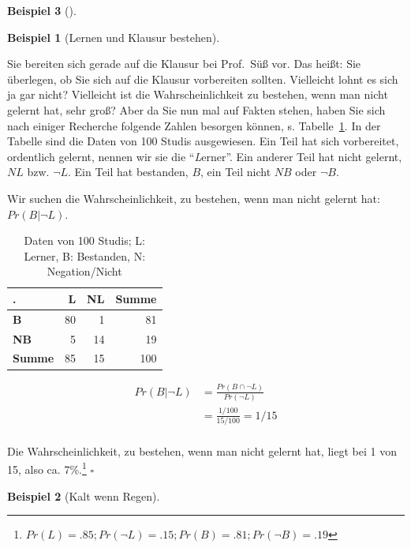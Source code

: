\documentclass[
  ngerman,
  letterpaper,
  twoside,
  open=any]{scrbook}
\theoremstyle{definition}
\newtheorem{example}{Beispiel}[chapter]
\theoremstyle{plain}
\theoremstyle{definition}
\theoremstyle{definition}
\theoremstyle{remark}
\begin{document}
\begin{example}[]
\begin{example}[Lernen und Klausur
bestehen]\protect\hypertarget{exm-klausur-bed-wskt2}{}\label{exm-klausur-bed-wskt2}

Sie bereiten sich gerade auf die Klausur bei Prof.~Süß vor. Das heißt:
Sie überlegen, ob Sie sich auf die Klausur vorbereiten sollten.
Vielleicht lohnt es sich ja gar nicht? Vielleicht ist die
Wahrscheinlichkeit zu bestehen, wenn man nicht gelernt hat, sehr groß?
Aber da Sie nun mal auf Fakten stehen, haben Sie sich nach einiger
Recherche folgende Zahlen besorgen können, s.
Tabelle~\ref{tbl-klausur-lernen}. In der Tabelle sind die Daten von 100
Studis ausgewiesen. Ein Teil hat sich vorbereitet, ordentlich gelernt,
nennen wir sie die \enquote{\emph{L}erner}. Ein anderer Teil hat nicht
gelernt, \(NL\) bzw. \(\neg L\). Ein Teil hat bestanden, \(B\), ein Teil
nicht \(NB\) oder \(\neg B\).

Wir suchen die Wahrscheinlichkeit, zu bestehen, wenn man nicht gelernt
hat: \(Pr(B |\neg L)\).

\begin{longtable}[t]{>{}lrrr}

\caption{\label{tbl-klausur-lernen}Daten von 100 Studis; L: Lerner, B:
Bestanden, N: Negation/Nicht}

\tabularnewline

\toprule
. & L & NL & Summe\\
\midrule
\textbf{B} & 80 & 1 & 81\\
\textbf{NB} & 5 & 14 & 19\\
\textbf{Summe} & 85 & 15 & 100\\
\bottomrule

\end{longtable}

\begin{align}
Pr(B |\neg L) &= \frac{Pr(B \cap \neg L)}{Pr(\neg L)} \\
&=\frac{1/100}{15/100} = 1/15 \\
\end{align}

Die Wahrscheinlichkeit, zu bestehen, wenn man nicht gelernt hat, liegt
bei 1 von 15, also ca. 7\%.\footnote{\(Pr(L) = .85; Pr(\neg L) = .15; Pr(B) =.81; Pr(\neg B) = .19\)}
\(\square\)

\end{example}

\begin{example}[Kalt wenn
Regen]\protect\hypertarget{exm-kalt-regen}{}\label{exm-kalt-regen}


\end{example}
\end{example}
\end{document}
